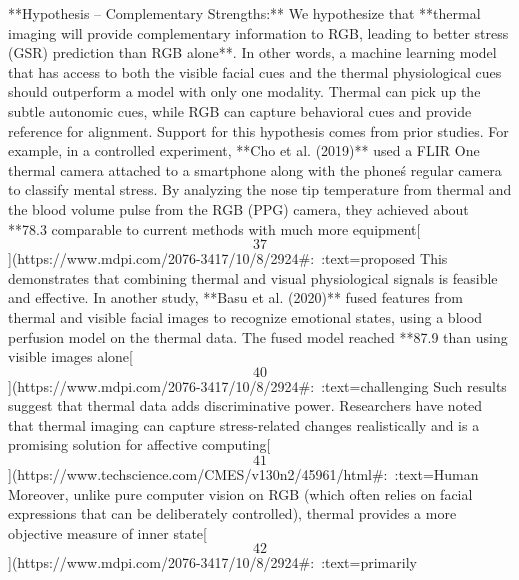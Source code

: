 \documentclass[12pt,a4paper]{article}
\begin{document}
**Hypothesis -- Complementary Strengths:** We hypothesize that **thermal
imaging will provide complementary information to RGB, leading to better
stress (GSR) prediction than RGB alone**. In other words, a machine
learning model that has access to both the visible facial cues and the
thermal physiological cues should outperform a model with only one
modality. Thermal can pick up the subtle autonomic cues, while RGB can
capture behavioral cues and provide reference for alignment. Support for
this hypothesis comes from prior studies. For example, in a controlled
experiment, **Cho et al. (2019)** used a FLIR One thermal camera
attached to a smartphone along with the phone\'s regular camera to
classify mental stress. By analyzing the nose tip temperature from
thermal and the blood volume pulse from the RGB (PPG) camera, they
achieved about **78.3%
comparable to current methods with much more
equipment[\[37\]](https://www.mdpi.com/2076-3417/10/8/2924#:~:text=proposed%
This demonstrates that combining thermal and visual physiological
signals is feasible and effective. In another study, **Basu et al.
(2020)** fused features from thermal and visible facial images to
recognize emotional states, using a blood perfusion model on the thermal
data. The fused model reached **87.9%
than using visible images
alone[\[40\]](https://www.mdpi.com/2076-3417/10/8/2924#:~:text=challenging%
Such results suggest that thermal data adds discriminative power.
Researchers have noted that thermal imaging can capture stress-related
changes realistically and is a promising solution for affective
computing[\[41\]](https://www.techscience.com/CMES/v130n2/45961/html#:~:text=Human%
Moreover, unlike pure computer vision on RGB (which often relies on
facial expressions that can be deliberately controlled), thermal
provides a more objective measure of inner
state[\[42\]](https://www.mdpi.com/2076-3417/10/8/2924#:~:text=primarily%
\end{document}
